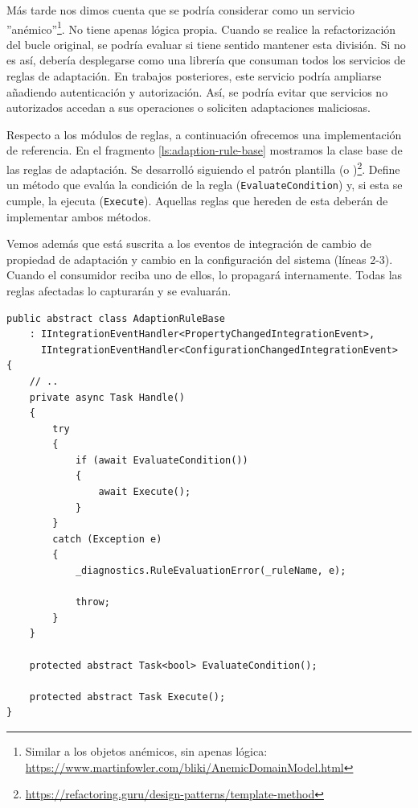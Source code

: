 Más tarde nos dimos cuenta que se podría considerar como un servicio ''anémico''\footnote{Similar a los objetos anémicos, sin apenas lógica: \url{https://www.martinfowler.com/bliki/AnemicDomainModel.html}}. \cite{singjaiPatternsDerivingAPIs2021} No tiene apenas lógica propia. Cuando se realice la refactorización del bucle original, se podría evaluar si tiene sentido mantener esta división. Si no es así, debería desplegarse como una librería que consuman todos los servicios de reglas de adaptación. En trabajos posteriores, este servicio podría ampliarse añadiendo autenticación y autorización. Así, se podría evitar que servicios no autorizados accedan a sus operaciones o soliciten adaptaciones maliciosas.

Respecto a los módulos de reglas, a continuación ofrecemos una implementación de referencia. En el fragmento \ref{ls:adaption-rule-base} mostramos la clase base de las reglas de adaptación. Se desarrolló siguiendo el patrón plantilla (o )\footnote{\url{https://refactoring.guru/design-patterns/template-method}}. Define un método que evalúa la condición de la regla (\texttt{EvaluateCondition}) y, si esta se cumple, la ejecuta (\texttt{Execute}). Aquellas reglas que hereden de esta deberán de implementar ambos métodos.

Vemos además que está suscrita a los eventos de integración de cambio de propiedad de adaptación y cambio en la configuración del sistema (líneas 2-3). Cuando el consumidor reciba uno de ellos, lo propagará internamente. Todas las reglas afectadas lo capturarán y se evaluarán.

\begin{lstlisting}[caption={Clase base para implementar reglas de adaptación. Se evalúa la condición, y si esta se cumple, se ejecuta. \protect\footnotemark},captionpos=b, label=ls:adaption-rule-base]
public abstract class AdaptionRuleBase
    : IIntegrationEventHandler<PropertyChangedIntegrationEvent>,
      IIntegrationEventHandler<ConfigurationChangedIntegrationEvent>
{
    // ..
    private async Task Handle()
    {
        try
        {
            if (await EvaluateCondition())
            {
                await Execute();
            }
        }
        catch (Exception e)
        {
            _diagnostics.RuleEvaluationError(_ruleName, e);

            throw;
        }
    }

    protected abstract Task<bool> EvaluateCondition();

    protected abstract Task Execute();
}
\end{lstlisting}

